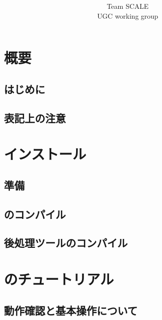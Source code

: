\documentclass[a4paper]{jreport}
\title{{\vspace{2cm}{\Large Version \version} }}
\author{\Large Team SCALE\\ UGC working group}
\date{\西暦{\today}}
\begin{document}
\maketitle
\ClearWallPaper
{}
\tableofcontents


\part{概要} \label{part:overview}
 \chapter{はじめに} \label{sec:introduction}
 
 \chapter{表記上の注意} \label{sec:notation}
 

\part{インストール} \label{part:install}
 \chapter{準備}
 
 \chapter{\scalelib のコンパイル}
 
 \chapter{後処理ツールのコンパイル}
 

\part{\scalerm のチュートリアル}
\chapter{動作確認と基本操作について} \label{chap:tutorial_ideal}




\end{document}
